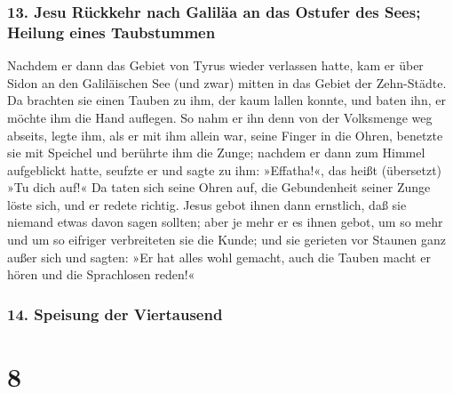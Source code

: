 \hypertarget{jesu-ruxfcckkehr-nach-galiluxe4a-an-das-ostufer-des-sees-heilung-eines-taubstummen}{%
\subsubsection{13. Jesu Rückkehr nach Galiläa an das Ostufer des Sees;
Heilung eines
Taubstummen}\label{jesu-ruxfcckkehr-nach-galiluxe4a-an-das-ostufer-des-sees-heilung-eines-taubstummen}}

 Nachdem er dann das Gebiet von Tyrus wieder verlassen
hatte, kam er über Sidon an den Galiläischen See (und zwar) mitten in
das Gebiet der Zehn-Städte.  Da brachten sie einen Tauben
zu ihm, der kaum lallen konnte, und baten ihn, er möchte ihm die Hand
auflegen.  So nahm er ihn denn von der Volksmenge weg
abseits, legte ihm, als er mit ihm allein war, seine Finger in die
Ohren, benetzte sie mit Speichel und berührte ihm die Zunge;
 nachdem er dann zum Himmel aufgeblickt hatte, seufzte er
und sagte zu ihm: »Effatha!«, das heißt (übersetzt) »Tu dich auf!«
 Da taten sich seine Ohren auf, die Gebundenheit seiner
Zunge löste sich, und er redete richtig.  Jesus gebot
ihnen dann ernstlich, daß sie niemand etwas davon sagen sollten; aber je
mehr er es ihnen gebot, um so mehr und um so eifriger verbreiteten sie
die Kunde;  und sie gerieten vor Staunen ganz außer sich
und sagten: »Er hat alles wohl gemacht, auch die Tauben macht er hören
und die Sprachlosen reden!«

\hypertarget{speisung-der-viertausend}{%
\subsubsection{14. Speisung der
Viertausend}\label{speisung-der-viertausend}}

\hypertarget{section-7}{%
\section{8}\label{section-7}}

